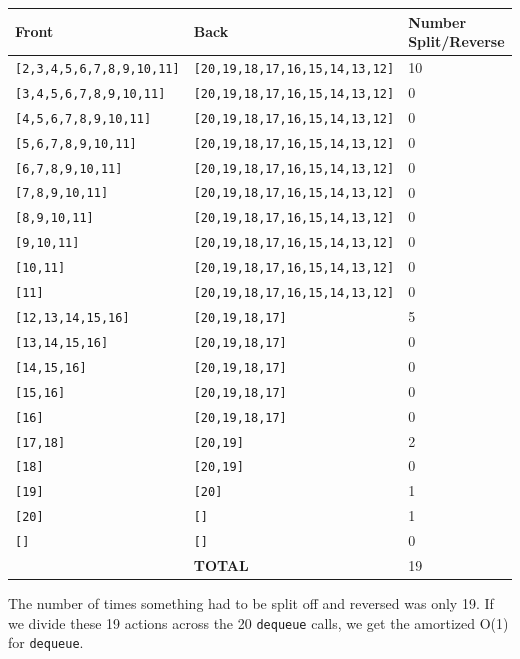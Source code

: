 \documentclass[
]{book}
\begin{document}
\begin{longtable}[]{@{}lll@{}}
\toprule
Front & Back & Number Split/Reverse \\
\midrule
\endhead
\texttt{{[}2,3,4,5,6,7,8,9,10,11{]}} & \texttt{{[}20,19,18,17,16,15,14,13,12{]}} & 10 \\
\texttt{{[}3,4,5,6,7,8,9,10,11{]}} & \texttt{{[}20,19,18,17,16,15,14,13,12{]}} & 0 \\
\texttt{{[}4,5,6,7,8,9,10,11{]}} & \texttt{{[}20,19,18,17,16,15,14,13,12{]}} & 0 \\
\texttt{{[}5,6,7,8,9,10,11{]}} & \texttt{{[}20,19,18,17,16,15,14,13,12{]}} & 0 \\
\texttt{{[}6,7,8,9,10,11{]}} & \texttt{{[}20,19,18,17,16,15,14,13,12{]}} & 0 \\
\texttt{{[}7,8,9,10,11{]}} & \texttt{{[}20,19,18,17,16,15,14,13,12{]}} & 0 \\
\texttt{{[}8,9,10,11{]}} & \texttt{{[}20,19,18,17,16,15,14,13,12{]}} & 0 \\
\texttt{{[}9,10,11{]}} & \texttt{{[}20,19,18,17,16,15,14,13,12{]}} & 0 \\
\texttt{{[}10,11{]}} & \texttt{{[}20,19,18,17,16,15,14,13,12{]}} & 0 \\
\texttt{{[}11{]}} & \texttt{{[}20,19,18,17,16,15,14,13,12{]}} & 0 \\
\texttt{{[}12,13,14,15,16{]}} & \texttt{{[}20,19,18,17{]}} & 5 \\
\texttt{{[}13,14,15,16{]}} & \texttt{{[}20,19,18,17{]}} & 0 \\
\texttt{{[}14,15,16{]}} & \texttt{{[}20,19,18,17{]}} & 0 \\
\texttt{{[}15,16{]}} & \texttt{{[}20,19,18,17{]}} & 0 \\
\texttt{{[}16{]}} & \texttt{{[}20,19,18,17{]}} & 0 \\
\texttt{{[}17,18{]}} & \texttt{{[}20,19{]}} & 2 \\
\texttt{{[}18{]}} & \texttt{{[}20,19{]}} & 0 \\
\texttt{{[}19{]}} & \texttt{{[}20{]}} & 1 \\
\texttt{{[}20{]}} & \texttt{{[}{]}} & 1 \\
\texttt{{[}{]}} & \texttt{{[}{]}} & 0 \\
& \textbf{TOTAL} & 19 \\
\bottomrule
\end{longtable}

The number of times something had to be split off and reversed was only 19. If we divide these 19 actions across the 20 \texttt{dequeue} calls, we get the amortized O(1) for \texttt{dequeue}.
\end{document}
